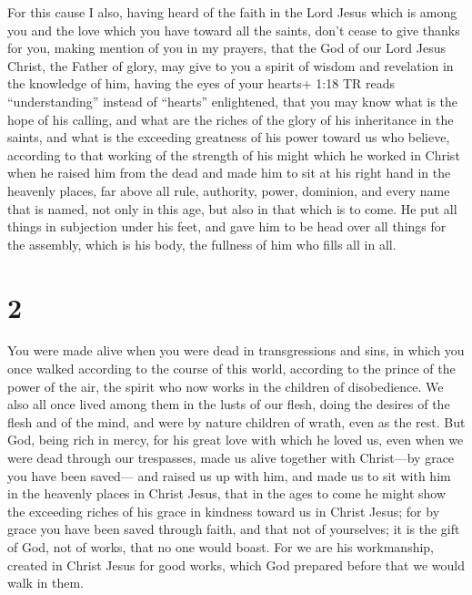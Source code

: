  For this cause I also, having heard of the faith in the
Lord Jesus which is among you and the love which you have toward all the
saints,  don't cease to give thanks for you, making mention
of you in my prayers,  that the God of our Lord Jesus
Christ, the Father of glory, may give to you a spirit of wisdom and
revelation in the knowledge of him,  having the eyes of
your hearts+ 1:18 TR reads ``understanding'' instead of ``hearts''
enlightened, that you may know what is the hope of his calling, and what
are the riches of the glory of his inheritance in the saints,
 and what is the exceeding greatness of his power toward us
who believe, according to that working of the strength of his might
 which he worked in Christ when he raised him from the dead
and made him to sit at his right hand in the heavenly places,
 far above all rule, authority, power, dominion, and every
name that is named, not only in this age, but also in that which is to
come.  He put all things in subjection under his feet, and
gave him to be head over all things for the assembly, 
which is his body, the fullness of him who fills all in all.

\hypertarget{section-1}{%
\section{2}\label{section-1}}

 You were made alive when you were dead in transgressions
and sins,  in which you once walked according to the course
of this world, according to the prince of the power of the air, the
spirit who now works in the children of disobedience.  We
also all once lived among them in the lusts of our flesh, doing the
desires of the flesh and of the mind, and were by nature children of
wrath, even as the rest.  But God, being rich in mercy, for
his great love with which he loved us,  even when we were
dead through our trespasses, made us alive together with Christ---by
grace you have been saved---  and raised us up with him, and
made us to sit with him in the heavenly places in Christ Jesus,
 that in the ages to come he might show the exceeding riches
of his grace in kindness toward us in Christ Jesus;  for by
grace you have been saved through faith, and that not of yourselves; it
is the gift of God,  not of works, that no one would boast.
 For we are his workmanship, created in Christ Jesus for
good works, which God prepared before that we would walk in them.


